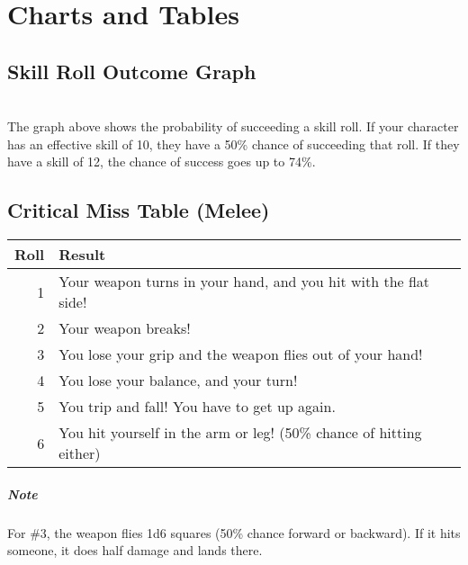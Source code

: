 \chapter{Charts and Tables}
\section{Skill Roll Outcome Graph}
\\
The graph above shows the probability of succeeding a skill roll. If your character has an effective skill of 10, they have a 50\% chance of succeeding that roll. If they have a skill of 12, the chance of success goes up to 74\%.
\section{Critical Miss Table (Melee)}
\begin{center}
\begin{tabular}{r | l}
    \textbf{Roll} & \textbf{Result}\\\hline
    1 & Your weapon turns in your hand, and you hit with the flat side! \\
    2 & Your weapon breaks! \\
    3 & You lose your grip and the weapon flies out of your hand! \\
    4 & You lose your balance, and your turn! \\
    5 & You trip and fall! You have to get up again.\\
    6 & You hit yourself in the arm or leg! (50\% chance of hitting either)\\
\end{tabular}
\end{center}
\paragraph{Note}For \#3, the weapon flies 1d6 squares (50\% chance forward or backward). If it hits someone, it does half damage and lands there.

